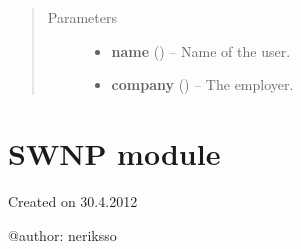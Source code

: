 \documentclass[letterpaper,10pt,english]{sphinxmanual}
\begin{document}
\begin{fulllineitems}
\begin{description}
\end{description}
\begin{quote}\begin{description}
\item[{Parameters}] \leavevmode\begin{itemize}
\item {} 
\textbf{name} () -- Name of the user.

\item {} 
\textbf{company} ({\hyperref[api:models.Company]{}}) -- The employer.

\end{itemize}

\end{description}\end{quote}

\end{fulllineitems}



\section{SWNP module}
\label{api:swnp-module}\label{api:module-swnp}
Created on 30.4.2012

@author: neriksso
\end{document}
